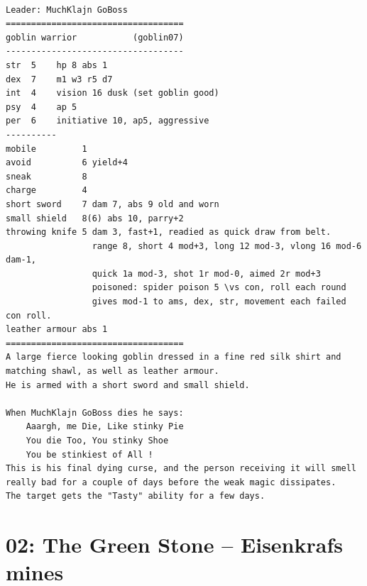 \documentclass[11pt, twoside, titlepage, a4paper]{report}
\renewcommand{\chaptermark}[1]{\markboth{#1}{}}
\newcommand{\vs}{$\backslash\ $}  %
\begin{document}
\

\goodbreak \begin{samepage} \small \begin{verbatim}
Leader: MuchKlajn GoBoss
===================================
goblin warrior           (goblin07)
-----------------------------------
str  5    hp 8 abs 1
dex  7    m1 w3 r5 d7
int  4    vision 16 dusk (set goblin good)
psy  4    ap 5
per  6    initiative 10, ap5, aggressive
----------
mobile         1
avoid          6 yield+4
sneak          8
charge         4
short sword    7 dam 7, abs 9 old and worn
small shield   8(6) abs 10, parry+2
throwing knife 5 dam 3, fast+1, readied as quick draw from belt.
                 range 8, short 4 mod+3, long 12 mod-3, vlong 16 mod-6 dam-1,
                 quick 1a mod-3, shot 1r mod-0, aimed 2r mod+3
                 poisoned: spider poison 5 \vs con, roll each round
                 gives mod-1 to ams, dex, str, movement each failed con roll.
leather armour abs 1
===================================
A large fierce looking goblin dressed in a fine red silk shirt and
matching shawl, as well as leather armour.
He is armed with a short sword and small shield.

When MuchKlajn GoBoss dies he says:
    Aaargh, me Die, Like stinky Pie
    You die Too, You stinky Shoe
    You be stinkiest of All !
This is his final dying curse, and the person receiving it will smell
really bad for a couple of days before the weak magic dissipates.
The target gets the "Tasty" ability for a few days.
\end{verbatim} \normalsize \end{samepage}


\flushbottom
















\clearpage
{}
\section*{02: The Green Stone -- Eisenkrafs mines}
\chaptermark{green stone}
\end{document}
